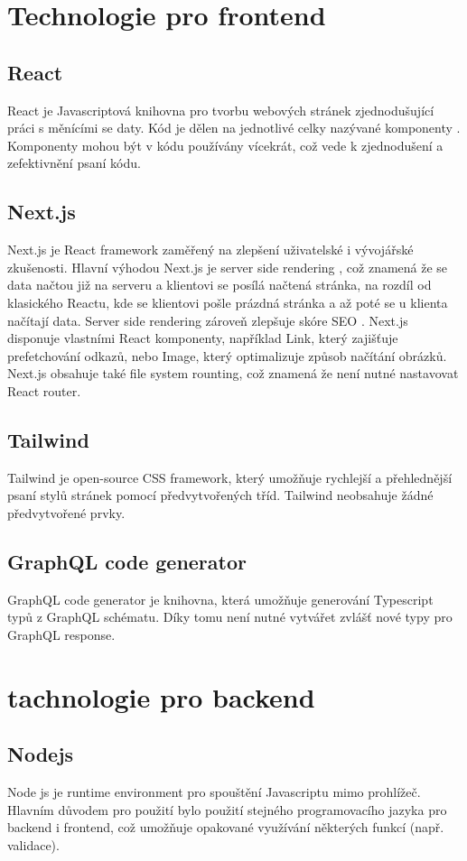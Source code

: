 \documentclass[12pt, a4paper,
 twoside,        %
 openright
]{report}
\begin{document}
\section{Technologie pro frontend}
\subsection{React}
React je Javascriptová knihovna pro tvorbu webových stránek zjednodušující práci s měnícími se daty. Kód je dělen na jednotlivé celky nazývané komponenty \cite{reactComponentsAndProps}. Komponenty mohou být v kódu používány vícekrát, což vede k zjednodušení a zefektivnění psaní kódu. \cite{gettingStartedReact}
\subsection{Next.js}
Next.js je React framework zaměřený na zlepšení uživatelské i vývojářské zkušenosti. Hlavní výhodou Next.js je server side rendering \cite{whatIsSSR}, což znamená že se data načtou již na serveru a klientovi se posílá načtená stránka, na rozdíl od klasického Reactu, kde se klientovi pošle prázdná stránka a až poté se u klienta načítají data. Server side rendering zároveň zlepšuje skóre SEO \cite{whatIsSEO}. Next.js disponuje vlastními React komponenty, například Link, který zajišťuje prefetchování odkazů, nebo Image, který optimalizuje způsob načítání obrázků. Next.js obsahuje také file system rounting, což znamená že není nutné nastavovat React router. \cite{nextGetStarted}
\subsection{Tailwind}
Tailwind je open-source CSS framework, který umožňuje rychlejší a přehlednější psaní stylů stránek pomocí předvytvořených tříd. Tailwind neobsahuje žádné předvytvořené prvky.\cite{tailwindDocumentation}
\subsection{GraphQL code generator}
GraphQL code generator je knihovna, která umožňuje generování Typescript typů z GraphQL schématu. Díky tomu není nutné vytvářet zvlášť nové typy pro GraphQL response. \cite{graphqlCodeGeneratorDocs}
\section{tachnologie pro backend}
\subsection{Nodejs}
Node js je runtime environment pro spouštění Javascriptu mimo prohlížeč. Hlavním důvodem pro použití bylo použití stejného programovacího jazyka pro backend i frontend, což umožňuje opakované využívání některých funkcí (např. validace). \cite{aboutNodeJS}
 
\end{document}
